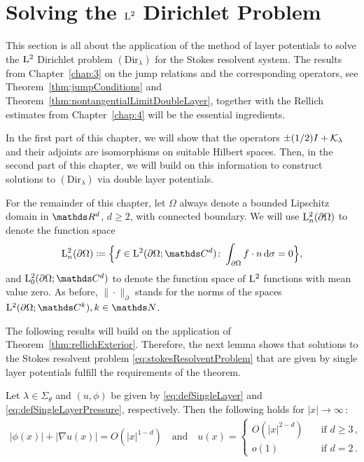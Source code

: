 \chapter{Solving the $\mathrm{L}^2$ Dirichlet Problem}
\label{chap:5}

This section is all about the application of the method of layer potentials to solve the $\mathrm{L}^2$ Dirichlet problem \hyperref[eq:dirProblem]{$(\mathrm{Dir}_\lambda)$} for the Stokes resolvent system.
The results from Chapter~\ref{chap:3} on the jump relations and the corresponding operators, see Theorem~\ref{thm:jumpConditions} and Theorem~\ref{thm:nontangentialLimitDoubleLayer}, together with the Rellich estimates from Chapter~\ref{chap:4} will be the essential ingredients.

In the first part of this chapter, we will show that the operators $\pm (1/2)I + \mathcal{K}_\lambda$ and their adjoints are isomorphisms on suitable Hilbert spaces.
Then, in the second part of this chapter, we will build on this information to construct solutions to $(\mathrm{Dir}_\lambda)$ via double layer potentials.

For the remainder of this chapter, let $\Omega$ always denote a bounded Lipschitz domain in $\R^d$, $d \geq 2$, with connected boundary.
We will use $\mathrm{L}^2_n(\partial\Omega)$ to denote the function space
\begin{align*}
  \Ell^2_n(\partial\Omega) \coloneqq \Big\{ f \in \Ell^2(\partial\Omega; \C^d) \colon \int_{\partial\Omega} f \cdot n \d \sigma = 0 \Big\},
\end{align*}
and $\Ell_0^2(\partial\Omega; \C^d)$  to denote the function space of $\mathrm{L}^2$ functions with mean value zero.
As before, $\| \cdot \|^{}_\partial$ stands for the norms of the spaces $\Ell^2(\partial\Omega; \C^k), k \in \N$.

The following results will build on the application of Theorem~\ref{thm:rellichExterior}.
Therefore, the next lemma shows that solutions to the Stokes resolvent problem \eqref{eq:stokesResolventProblem} that are given by single layer potentials fulfill the requirements of the theorem.

\begin{lem}
  \label{lem:requirements}
  Let $\lambda \in \Sigma_\theta$ and $(u,\phi)$ be given by \eqref{eq:defSingleLayer} and \eqref{eq:defSingleLayerPressure}, respectively.
  Then the following holds for $|x| \to \infty\,$:
  \begin{align*}
    |\phi(x)| + |\nabla u(x)| = O(|x|^{1 - d}) \quad\text{and}\quad 
    u(x) = \begin{cases} O(|x|^{2 - d}) &\quad\text{if } d \geq 3\,, \\ o(1) &\quad\text{if } d = 2\,. \end{cases}
  \end{align*}
\end{lem}

